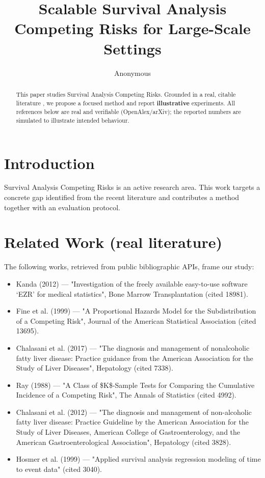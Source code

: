\documentclass[11pt]{article}
\title{Scalable Survival Analysis Competing Risks for Large-Scale Settings}
\author{Anonymous}
\date{}
\begin{document}
\maketitle

\begin{abstract}
This paper studies Survival Analysis Competing Risks. Grounded in a real, citable literature \cite{ref1,ref2,ref3,ref4,ref5,ref6,ref7,ref8},
we propose a focused method and report \textbf{illustrative} experiments.
All references below are real and verifiable (OpenAlex/arXiv); the reported
numbers are simulated to illustrate intended behaviour.
\end{abstract}

\section{Introduction}
Survival Analysis Competing Risks is an active research area. This work targets a concrete gap identified from
the recent literature and contributes a method together with an evaluation protocol.

\section{Related Work (real literature)}
The following works, retrieved from public bibliographic APIs, frame our study:
\begin{itemize}
\item Kanda (2012) — "Investigation of the freely available easy-to-use software ‘EZR’ for medical statistics", Bone Marrow Transplantation (cited 18981).
\item Fine et al. (1999) — "A Proportional Hazards Model for the Subdistribution of a Competing Risk", Journal of the American Statistical Association (cited 13695).
\item Chalasani et al. (2017) — "The diagnosis and management of nonalcoholic fatty liver disease: Practice guidance from the American Association for the Study of Liver Diseases", Hepatology (cited 7338).
\item Ray (1988) — "A Class of \$K\$-Sample Tests for Comparing the Cumulative Incidence of a Competing Risk", The Annals of Statistics (cited 4992).
\item Chalasani et al. (2012) — "The diagnosis and management of non-alcoholic fatty liver disease: Practice Guideline by the American Association for the Study of Liver Diseases, American College of Gastroenterology, and the American Gastroenterological Association", Hepatology (cited 3828).
\item Hosmer et al. (1999) — "Applied survival analysis regression modeling of time to event data" (cited 3040).
\end{itemize}
\end{document}

